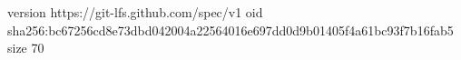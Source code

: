 version https://git-lfs.github.com/spec/v1
oid sha256:bc67256cd8e73dbd042004a22564016e697dd0d9b01405f4a61bc93f7b16fab5
size 70
